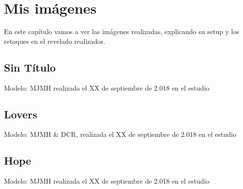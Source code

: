 \chapter{Mis im\'agenes}

En este cap\'itulo vamos a ver las im\'agenes realizadas, explicando su setup y los retoques en el revelado realizados.

\section{Sin T\'itulo}
Modelo: MJMH realizada el XX de septiembre de 2.018 en el estudio

\section{Lovers}
Modelo: MJMH \& DCR, realizada el XX de septiembre de 2.018 en el estudio

\section{Hope}
Modelo: MJMH realizada el XX de septiembre de 2.018 en el estudio

